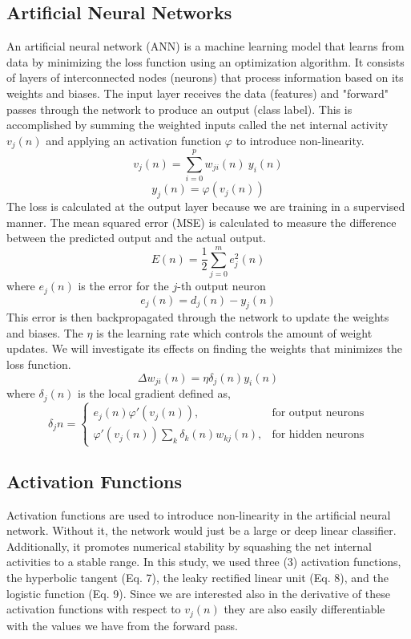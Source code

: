 \documentclass{acm_proc_article-sp}
\begin{document}
\subsection{Artificial Neural Networks}
An artificial neural network (ANN) is a machine learning model that learns from data by minimizing the loss function using an optimization algorithm. It consists of layers of interconnected nodes (neurons) that process information based on its weights and biases. The input layer receives the data (features) and "forward" passes through the network to produce an output (class label). This is accomplished by summing the weighted inputs called the net internal activity $v_j(n)$ and applying an activation function $\varphi$ to introduce non-linearity.
\begin{equation}
    v_j(n) = \sum_{i=0}^p w_{ji}(n)\ y_i(n)
\end{equation}
\begin{equation}
    y_j(n) = \varphi(v_j(n))
\end{equation}
The loss is calculated at the output layer because we are training in a supervised manner. The mean squared error (MSE) is calculated to measure the difference between the predicted output and the actual output.
\begin{equation}
    E(n) = \frac{1}{2} \sum_{j=0}^m e_j^2(n)
\end{equation}
where $e_j(n)$ is the error for the $j$-th output neuron
\begin{equation}
    e_j(n) = d_j(n) - y_j(n)
\end{equation}
This error is then backpropagated through the network to update the weights and biases. The $\eta$ is the learning rate which controls the amount of weight updates. We will investigate its effects on finding the weights that minimizes the loss function.
\begin{equation}
\Delta w_{ji}(n)=\eta\delta_j(n)y_i(n)
\end{equation}
where $\delta_j(n)$ is the local gradient defined as,
\begin{equation}
\delta_j{n} =  \begin{cases}
e_j(n)\varphi'(v_j(n)), & \text{for output neurons} \\
\varphi'(v_j(n))\sum_k\delta_k(n)w_{kj}(n), & \text{for hidden neurons}
\end{cases}
\end{equation}


\subsection{Activation Functions}
Activation functions are used to introduce non-linearity in the artificial neural network. Without it, the network would just be a large or deep linear classifier. Additionally, it promotes numerical stability by squashing the net internal activities to a stable range. In this study, we used three (3) activation functions, the hyperbolic tangent (Eq. 7), the leaky rectified linear unit (Eq. 8), and the logistic function (Eq. 9). Since we are interested also in the derivative of these activation functions with respect to $v_j(n)$ they are also easily differentiable with the values we have from the forward pass.
\end{document}
